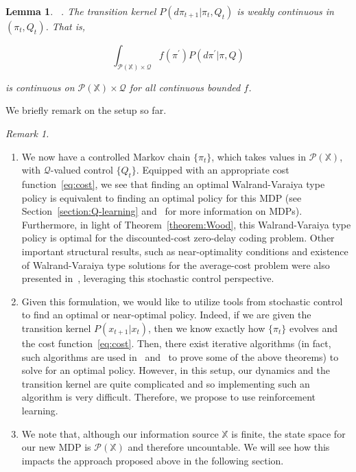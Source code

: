 \documentclass[conference]{IEEEtran}
\newtheorem{lemma}[theorem]{Lemma}
\begin{document}
\begin{lemma}\label{lemma:weak}~\cite[Lemma 11]{Linder}.
    The transition kernel \( P(d\pi_{t+1}|\pi_t,Q_t) \) is weakly continuous in \( (\pi_t,Q_t) \). That is,

    \[ \int_{\mathcal{P}(\mathbb{X}) \times \mathcal{Q}} f(\pi^{'})P(d \pi^{'}|\pi, Q) \]

    is continuous on \( \mathcal{P}(\mathbb{X}) \times \mathcal{Q} \) for all continuous bounded \(f\).
\end{lemma}

\noindent We briefly remark on the setup so far.
\vspace{1em}

\noindent\emph{Remark 1.}\label{remark:1}
\begin{enumerate}[wide, labelwidth=!, labelindent=0pt]
    \item We now have a controlled Markov chain \(\{\pi_t\}\), which takes values in \(\mathcal{P}(\mathbb{X})\), with \(\mathcal{Q}\)-valued control \(\{Q_t\}\). Equipped with an appropriate cost function~\eqref{eq:cost}, we see that finding an optimal Walrand-Varaiya type policy is equivalent to finding an optimal policy for this MDP (see Section~\ref{section:Q-learning} and~\cite{Lerma} for more information on MDPs). Furthermore, in light of Theorem~\ref{theorem:Wood}, this Walrand-Varaiya type policy is optimal for the discounted-cost zero-delay coding problem. Other important structural results, such as near-optimality conditions and existence of Walrand-Varaiya type solutions for the average-cost problem were also presented in~\cite{Wood}, leveraging this stochastic control perspective.
    \item Given this formulation, we would like to utilize tools from stochastic control to find an optimal or near-optimal policy. Indeed, if we are given the transition kernel \(P(x_{t+1} | x_t)\), then we know exactly how \(\{\pi_t\}\) evolves and the cost function~\eqref{eq:cost}. Then, there exist iterative algorithms (in fact, such algorithms are used in~\cite{Witsenhausen} and~\cite{Wood} to prove some of the above theorems) to solve for an optimal policy. However, in this setup, our dynamics and the transition kernel are quite complicated and so implementing such an algorithm is very difficult. Therefore, we propose to use reinforcement learning.
    \item We note that, although our information source \(\mathbb{X}\) is finite, the state space for our new MDP is \(\mathcal{P}(\mathbb{X})\) and therefore uncountable. We will see how this impacts the approach proposed above in the following section.
\end{enumerate}
\end{document}
